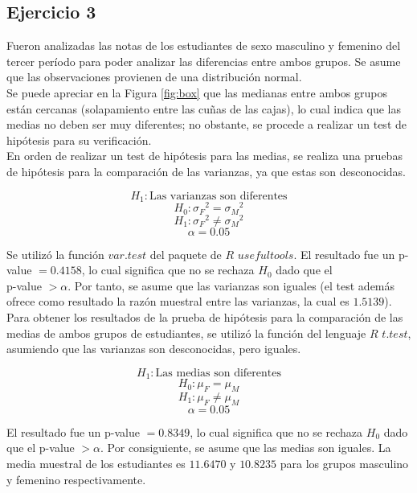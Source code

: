 \documentclass[a4paper,10pt,twocolumn]{article}
\begin{document}
	\subsection{Ejercicio 3}\label{sub:results3}
	Fueron analizadas las notas de los estudiantes de sexo masculino y femenino del tercer período para poder analizar las diferencias entre ambos grupos. Se asume que las observaciones provienen de una distribución normal. \\
	
	Se puede apreciar en la Figura \ref{fig:box} que las medianas entre ambos grupos están cercanas (solapamiento entre las cuñas de las cajas), lo cual indica que las medias no deben ser muy diferentes; no obstante, se procede a realizar un test de hipótesis para su verificación.\\
	
	En orden de realizar un test de hipótesis para las medias, se realiza una pruebas de hipótesis para la comparación de las varianzas, ya que estas son desconocidas.
	
	$$H_1: \text{Las varianzas son diferentes}$$
	$$H_0: {\sigma_F}^2 = {\sigma_M}^2$$
	$$H_1: {\sigma_F}^2 \neq {\sigma_M}^2$$
	$$\alpha = 0.05$$
	
	Se utilizó la función $var.test$ del paquete de $R$ $usefultools$. El resultado fue un p-value $= 0.4158$, lo cual significa que no se rechaza $H_0$ dado que el \\ p-value $> \alpha$. Por tanto, se asume que las varianzas son iguales (el test además ofrece como resultado la razón muestral entre las varianzas, la cual es $1.5139$).\\
	
	Para obtener los resultados de la prueba de hipótesis para la comparación de las medias de ambos grupos de estudiantes, se utilizó la función del lenguaje $R$ $t.test$, asumiendo que las varianzas son desconocidas, pero iguales.
	
	$$H_1: \text{Las medias son diferentes}$$
	$$H_0: \mu_F = \mu_M$$
	$$H_1: \mu_F \neq \mu_M$$
	$$\alpha = 0.05$$
	
	El resultado fue un p-value $= 0.8349$, lo cual significa que no se rechaza $H_0$ dado que el p-value $> \alpha$. Por consiguiente, se asume que las medias son iguales. La media muestral de los estudiantes es $11.6470$ y $10.8235$ para los grupos masculino y femenino respectivamente.
\end{document}
